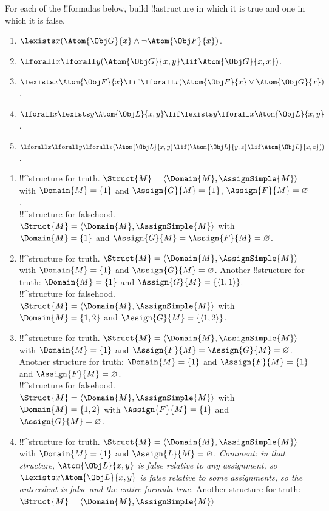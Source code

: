 \documentclass[../../../../include/open-logic-section]{subfiles}
\begin{document}
\begin{prob}
For each of the !!{formula}s below, build !!a{structure}
in which it is true and one in which it is false.
\begin{enumerate}
\item $\lexists x(\Atom{\Obj G}{x}\land\lnot \Atom{\Obj F}{x})$.
\item $\lforall x\lforall y(\Atom{\Obj G}{x,y}\lif \Atom{\Obj G}{x,x})$.
\item $\lexists x\Atom{\Obj F}{x}\lif\lforall x(\Atom{\Obj F}{x}\lor \Atom{\Obj G}{x})$.
\item $\lforall x\lexists y\Atom{\Obj L}{x,y}\lif\lexists y\lforall x\Atom{\Obj L}{x,y}$.
\item $\lforall x\lforall y\lforall z(\Atom{\Obj L}{x,y}\lif(\Atom{\Obj L}{y,z}\lif \Atom{\Obj L}{x,z}))$.
\end{enumerate}
\begin{ans}
\begin{enumerate}
	\item !!^{structure} for truth. $\Struct{M}=\langle\Domain{M},\AssignSimple{M}\rangle$
	with $\Domain{M}=\{1\}$ and $\Assign{G}{M}=\{1\}$, $\Assign{F}{M}=\varnothing$.\\
	!!^{structure} for falsehood. $\Struct{M}=\langle\Domain{M},\AssignSimple{M}\rangle$
	with $\Domain{M}=\{1\}$ and $\Assign{G}{M}=\Assign{F}{M}=\varnothing$.
	\item !!^{structure} for truth. $\Struct{M}=\langle\Domain{M},\AssignSimple{M}\rangle$
	with $\Domain{M}=\{1\}$ and $\Assign{G}{M}=\varnothing$. Another !!{structure} for truth: $\Domain{M}=\{1\}$ and $\Assign{G}{M}=\{\langle 1,1\rangle\}$.\\
	!!^{structure} for falsehood. $\Struct{M}=\langle\Domain{M},\AssignSimple{M}\rangle$
	with $\Domain{M}=\{1,2\}$ and $\Assign{G}{M}=\{\langle 1,2\rangle\}$.
	\item !!^{structure} for truth. $\Struct{M}=\langle\Domain{M},\AssignSimple{M}\rangle$
	with $\Domain{M}=\{1\}$ and $\Assign{F}{M}=\Assign{G}{M}=\varnothing$. 
	Another structure for truth: $\Domain{M}=\{1\}$ and $\Assign{F}{M}=\{1\}$ and $\Assign{F}{M}=\varnothing$.\\
	!!^{structure} for falsehood. $\Struct{M}=\langle\Domain{M},\AssignSimple{M}\rangle$
	with $\Domain{M}=\{1,2\}$ with $\Assign{F}{M}=\{1\}$ 
	and $\Assign{G}{M}=\varnothing$. 
	\item !!^{structure} for truth. $\Struct{M}=\langle\Domain{M},\AssignSimple{M}\rangle$
	with $\Domain{M}=\{1\}$ and $\Assign{L}{M}=\varnothing$. \emph{Comment: in that structure, $\Atom{\Obj L}{x,y}$ is false relative to any assignment, so $\lexists x \Atom{\Obj L}{x,y}$ is false relative to some assignments, so the antecedent is false and the entire formula true.} Another structure for truth: $\Struct{M}=\langle\Domain{M},\AssignSimple{M}\rangle$

\end{enumerate}
\end{ans}
\end{prob}
\end{document}
